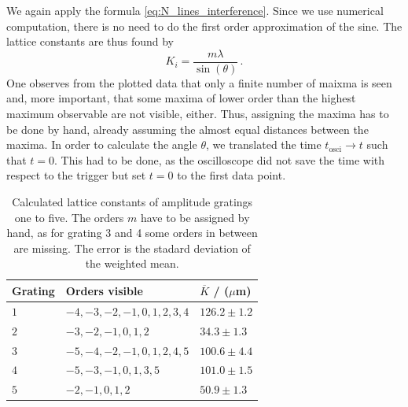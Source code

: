 We again apply the formula \ref{eq:N_lines_interference}. Since we use numerical computation, 
there is no need to do the first order approximation of the sine. The lattice constants are thus 
found by
\begin{equation}
    K_i = \frac{m\lambda}{\sin(\theta)}\, .
\end{equation}
One observes from the plotted data that only a finite number of maixma is seen and, more important, 
that some maxima of lower order than the highest maximum observable are not visible, either. 
Thus, assigning the maxima has to be done by hand, already assuming the almost equal distances between the 
maxima. In order to calculate the angle $\theta$, we translated the time $t_\mathrm{osci} \rightarrow t$ 
such that $t = 0$. 
This had to be done, as the oscilloscope did not save the time with respect to the trigger 
but set $t = 0$ to the first data point. 



\begin{table}[htdp]
    \centering
	\begin{tabular}{|p{3.82cm}|p{6.18cm}|p{3.82cm}|}
		\hline
		\rowcolor{LightCyan}
		Grating & Orders visible & $\overline{K}$ / ($\mu$m)  \\ \hline
		$1$  & $-4, -3, -2, -1, 0, 1, 2, 3, 4$ & $ 126.2 \pm 1.2$ \\
		$2$  & $-3, -2, -1, 0, 1, 2$ & $ 34.3 \pm 1.3$ \\
		$3$  & $-5, -4, -2, -1, 0, 1, 2, 4, 5$ & $ 100.6 \pm 4.4$ \\
		$4$  & $-5, -3, -1, 0, 1, 3, 5$ & $ 101.0 \pm 1.5$ \\
		$5$  & $-2, -1, 0, 1, 2$ & $ 50.9 \pm 1.3$ \\
		\hline
	\end{tabular}
    \caption{
        Calculated lattice constants of amplitude gratings one to five. 
        The orders $m$ have to be assigned by hand, as for grating 3 and 4 some 
        orders in between are missing. The error is the stadard deviation of 
        the weighted mean.
        }
    \label{tab:gratings_K}
\end{table}

